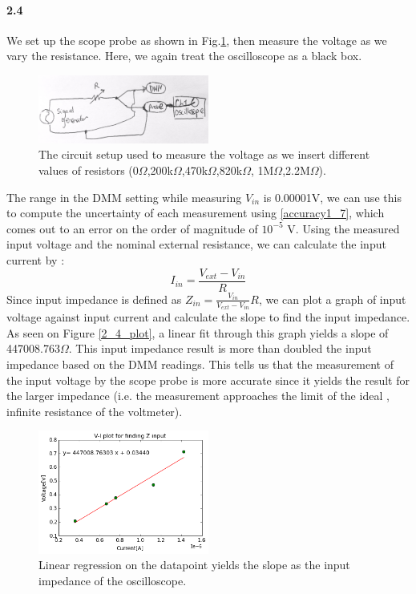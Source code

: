 \documentclass[authoryear, 12pt,5p, times]{elsarticle}
\begin{document}
\paragraph{\textbf{2.4}}
We set up the scope probe as shown in Fig.\ref{2_4_setup}, then measure the voltage as we vary the resistance. Here, we again treat the oscilloscope as a black box. 
\begin{figure}[h!]
\includegraphics[width=0.5\textwidth]{figure/2_4_setup}
\caption{The circuit setup used to measure the voltage as we insert different values of resistors (0$\Omega$,200k$\Omega$,470k$\Omega$,820k$\Omega$, 1M$\Omega$,2.2M$\Omega$).}
\label{2_4_setup}
\end{figure}
 The range in the DMM setting while measuring \(V_{in}\) is 0.00001V, we can use this to compute the uncertainty of each measurement using \ref{accuracy1_7}, which comes out to an error on the order of magnitude of $10^{-5}$ V. Using the measured  input voltage and the nominal external resistance, we can calculate the input current by : 
\begin{equation}
I_{in} = \frac{V_{ext} - V_{in}}{R}
\end{equation}
Since input impedance is defined as \(Z_{in} = \frac{V_{in}}{V_{ext} - V_{in}}R\), we can plot a graph of input voltage against input current and calculate the slope to find the input impedance. As seen on Figure \ref{2_4_plot}, a linear fit through this graph yields a slope of 447008.763\(\Omega\). This input impedance result is more than doubled the input impedance based on the DMM readings.  This tells us that the measurement of the input voltage by the scope probe is more accurate since it yields the result for the larger impedance (i.e. the measurement approaches the limit of the ideal , infinite resistance of the voltmeter).
\begin{figure}[h!]
\includegraphics[width=0.5\textwidth]{figure/1-2-4-input-impedance} 
\caption{Linear regression on the datapoint yields the slope as the input impedance of the oscilloscope.}
\label{Input_Impedance_probescope}
\end{figure}
\end{document}
